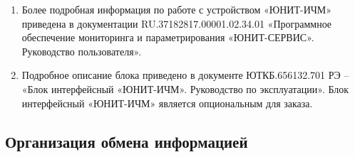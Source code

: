 \begin{enumerate}[label=\arabic{section}.\arabic{subsection}.\arabic*, labelsep=4pt, leftmargin=0pt, itemindent=57pt]
\begin{enumerate}[label=\arabic{section}.\arabic{subsection}.\arabic{enumi}.\arabic*, labelsep=4pt, leftmargin=0em, itemindent=65pt, parsep=0pt]
\item
Более подробная информация по работе с устройством «ЮНИТ-ИЧМ» приведена в документации RU.37182817.00001.02.34.01 «Программное обеспечение мониторинга и параметрирования «ЮНИТ-СЕРВИС». Руководство пользователя».

\item
Подробное описание блока приведено в документе ЮТКБ.656132.701 РЭ – «Блок интерфейсный «ЮНИТ-ИЧМ». Руководство по эксплуатации». Блок интерфейсный «ЮНИТ-ИЧМ» является опциональным для заказа.

\end{enumerate}

\end{enumerate}


\color{unidarkgreen}\subsection{Организация обмена информацией}\color{black}

